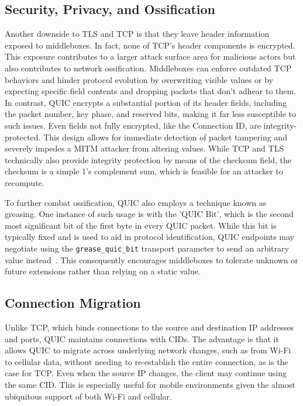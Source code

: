 \subsection{Security, Privacy, and Ossification}
\label{subsec:security-and-privacy}
Another downside to \ac{TLS} and \ac{TCP} is that they leave header information exposed to middleboxes. In fact, none of \ac{TCP}'s header components is encrypted. This exposure contributes to a larger attack surface area for malicious actors but also contributes to network ossification. Middleboxes can enforce outdated \ac{TCP} behaviors and hinder protocol evolution by overwriting visible values or by expecting specific field contents and dropping packets that don't adhear to them. In contrast, QUIC encrypts a substantial portion of its header fields, including the packet number, key phase, and reserved bits, making it far less susceptible to such issues. Even fields not fully encrypted, like the Connection ID, are integrity-protected. This design allows for immediate detection of packet tampering and severely impedes a \ac{MITM} attacker from altering values. While \ac{TCP} and \ac{TLS} technically also provide integrity protection by means of the checksum field, the checksum is a simple 1's complement sum, which is feasible for an attacker to recompute.

To further combat ossification, QUIC also employs a technique known as greasing. One instance of such usage is with the 'QUIC Bit', which is the second most significant bit of the first byte in every QUIC packet. While this bit is typically fixed and is used to aid in protocol identification, QUIC endpoints may negotiate using the \texttt{grease\_quic\_bit} transport parameter to send an arbitrary value instead~\cite{rfc9287}. This consequently encourages middleboxes to tolerate unknown or future extensions rather than relying on a static value.

\subsection{Connection Migration}
\label{subsec:connection-migration}
Unlike \ac{TCP}, which binds connections to the source and destination IP addresses and ports, QUIC maintains connections with \ac{CID}s. The advantage is that it allows QUIC to migrate across underlying network changes, such as from Wi-Fi to cellular data, without needing to re-establish the entire connection, as is the case for \ac{TCP}. Even when the source IP changes, the client may continue using the same \ac{CID}. This is especially useful for mobile environments given the almost ubiquitous support of both Wi-Fi and cellular.

